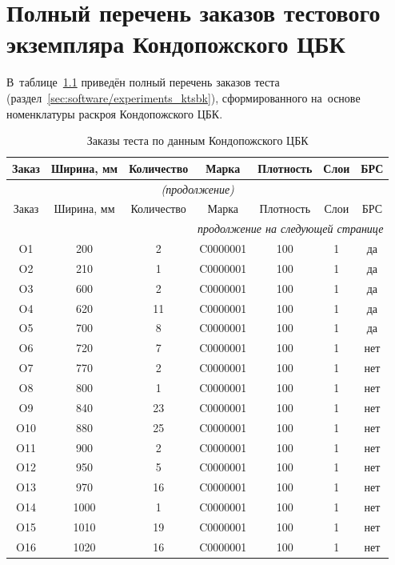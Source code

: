  
 

 \chapter{Полный перечень заказов тестового экземпляра Кондопожского ЦБК}
 \label{app:ktsbk_orders}

В~таблице~\ref{tab:ktsbk_orders_full} приведён полный перечень заказов теста (раздел~\ref{sec:software/experiments_ktsbk}), сформированного на~основе номенклатуры раскроя Кондопожского ЦБК.

\begin{longtable}{|c|c|c|c|c|c|c|}
\caption{Заказы теста по данным Кондопожского ЦБК}\label{tab:ktsbk_orders_full}\\
\hline
Заказ & Ширина, мм & Количество & Марка & Плотность & Слои & БРС \\
\hline
\endfirsthead
\multicolumn{7}{c}{\small\slshape (продолжение)} \\
\hline
Заказ & Ширина, мм & Количество & Марка & Плотность & Слои & БРС \\
\hline
\endhead
\hline
\multicolumn{7}{r}{\small\slshape продолжение на следующей странице} \\
\endfoot
\hline
\endlastfoot
O1 & 200 & 2 & C0000001 & 100 & 1 & да \\
O2 & 210 & 1 & C0000001 & 100 & 1 & да \\
O3 & 600 & 2 & C0000001 & 100 & 1 & да \\
O4 & 620 & 11 & C0000001 & 100 & 1 & да \\
O5 & 700 & 8 & C0000001 & 100 & 1 & да \\
O6 & 720 & 7 & C0000001 & 100 & 1 & нет \\
O7 & 770 & 2 & C0000001 & 100 & 1 & нет \\
O8 & 800 & 1 & C0000001 & 100 & 1 & нет \\
O9 & 840 & 23 & C0000001 & 100 & 1 & нет \\
O10 & 880 & 25 & C0000001 & 100 & 1 & нет \\
O11 & 900 & 2 & C0000001 & 100 & 1 & нет \\
O12 & 950 & 5 & C0000001 & 100 & 1 & нет \\
O13 & 970 & 16 & C0000001 & 100 & 1 & нет \\
O14 & 1000 & 1 & C0000001 & 100 & 1 & нет \\
O15 & 1010 & 19 & C0000001 & 100 & 1 & нет \\
O16 & 1020 & 16 & C0000001 & 100 & 1 & нет \\

\end{longtable}
